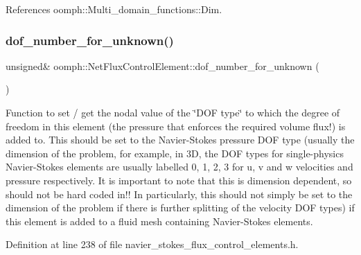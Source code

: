 References oomph\+::\+Multi\+\_\+domain\+\_\+functions\+::\+Dim.

\mbox{\label{classoomph_1_1NetFluxControlElement_a43142408a4d2cea51b26d0c641bb0f51}} 
\subsubsection{\texorpdfstring{dof\+\_\+number\+\_\+for\+\_\+unknown()}{dof\_number\_for\_unknown()}}
{\footnotesize\ttfamily unsigned\& oomph\+::\+Net\+Flux\+Control\+Element\+::dof\+\_\+number\+\_\+for\+\_\+unknown (\begin{DoxyParamCaption}{ }\end{DoxyParamCaption})\hspace{0.3cm}{\ttfamily [inline]}}



Function to set / get the nodal value of the \char`\"{}\+D\+O\+F type\char`\"{} to which the degree of freedom in this element (the pressure that enforces the required volume flux!) is added to. This should be set to the Navier-\/\+Stokes pressure D\+OF type (usually the dimension of the problem, for example, in 3D, the D\+OF types for single-\/physics Navier-\/\+Stokes elements are usually labelled 0, 1, 2, 3 for u, v and w velocities and pressure respectively. It is important to note that this is dimension dependent, so should not be hard coded in!! In particularly, this should not simply be set to the dimension of the problem if there is further splitting of the velocity D\+OF types) if this element is added to a fluid mesh containing Navier-\/\+Stokes elements. 



Definition at line 238 of file navier\+\_\+stokes\+\_\+flux\+\_\+control\+\_\+elements.\+h.

\mbox{\label{classoomph_1_1NetFluxControlElement_a7b7d3a32fcad5b06fe6a49f05f2c01a9}} 
